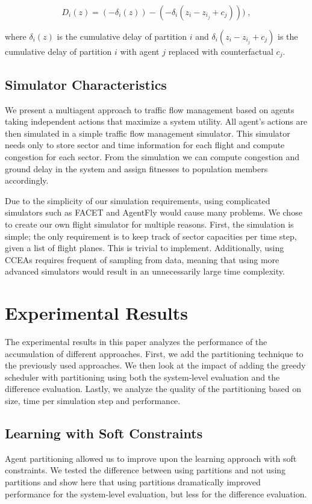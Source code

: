 \documentclass{sig-alternate}
\begin{document}
\begin{equation}
D_i(z) = (-\delta_i(z)) - (-\delta_i(z_i-z_{{i}_j} + c_j)))\;,
\end{equation}

where \textit{$\delta_i(z)$} is the cumulative delay of partition $i$ and \textit{$\delta_i(z_i-z_{{i}_j} + c_j)$} is the cumulative delay of partition $i$ with agent $j$ replaced with counterfactual \textit{$c_j$}.

\subsection{Simulator Characteristics}
We present a multiagent approach to traffic flow management based on agents taking independent actions that maximize a system utility. All agent's actions are then simulated in a simple traffic flow management simulator. This simulator needs only to store sector and time information for each flight and compute congestion for each sector. From the simulation we can compute congestion and ground delay in the system and assign fitnesses to population members accordingly.

Due to the simplicity of our simulation requirements, using complicated simulators such as FACET \cite{FACET} and AgentFly \cite{Sislak:2008:AMA:1402744.1402755} would cause many problems. We chose to create our own flight simulator for multiple reasons. First, the simulation is simple; the only requirement is to keep track of sector capacities per time step, given a list of flight planes. This is trivial to implement. Additionally, using CCEAs requires frequent of sampling from data, meaning that using more advanced simulators would result in an unnecessarily large time complexity.

\section{Experimental Results}
The experimental results in this paper analyzes the performance of the accumulation of different approaches. First, we add the partitioning technique to the previously used approaches. We then look at the impact of adding the greedy scheduler with partitioning using both the system-level evaluation and the difference evaluation. Lastly, we analyze the quality of the partitioning based on size, time per simulation step and performance. 

\subsection{Learning with Soft Constraints}
Agent partitioning allowed us to improve upon the learning approach with soft constraints. We tested the difference between using partitions and not using partitions and show here that using partitions dramatically improved performance for the system-level evaluation, but less for the difference evaluation.
\end{document}
